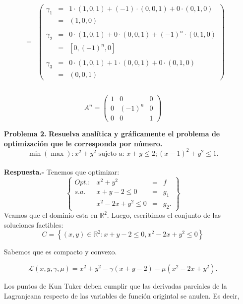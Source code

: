 \begin{enumerate}
$$\begin{array}{rcl}
	&=&
	\left(\begin{array}{rcl}
	    \gamma_1 &=& 1\cdot(1,0,1)+(-1)\cdot(0,0,1)+0\cdot(0,1,0)\\
		     &=&(1,0,0)\\\\
	    \gamma_2 &=& 0\cdot(1,0,1)+0\cdot(0,0,1)+(-1)^n\cdot(0,1,0)\\
		     &=&\left[0,(-1)^n,0\right]\\\\
	    \gamma_3 &=& 0\cdot(1,0,1)+1\cdot(0,0,1)+0\cdot(0,1,0)\\
		     &=&(0,0,1)
	\end{array}\right)\\\\
    \end{array}$$
    
    \begin{tcolorbox}
	$$A^n = \left(\begin{array}{*{3}{r}}
	    1 & 0 & 0 \\
	    0 & (-1)^n & 0 \\
	    0 & 0 & 1
	\end{array}\right)$$
    \end{tcolorbox}
    \vspace{1cm}



    \item [\bfseries Problema 2.] \textbf{\boldmath Resuelva analítica y gráficamente el problema de optimización que le corresponda por número.
    $$\min(\max):x^2+y^2\mbox{ sujeto a: } x+y\leq 2; (x-1)^2+y^2\leq 1.$$\\
	Respuesta.-\;} Tenemos que optimizar:
	$$\left\{\begin{array}{llll}
		Opt.: & x^2+y^2&=&f\\
		s.a. & x+y-2\leq 0&=&g_1\\
		     & x^2-2x+y^2\leq 0&=&g_2.
	\end{array}\right\}$$
	Veamos que el dominio esta en $\mathbb{R}^2$. Luego, escribimos el conjunto de las soluciones factibles:
	$$C=\left\{(x,y)\in \mathbb{R}^2:x+y-2\leq 0, x^2-2x+y^2\leq 0\right\}$$



	Sabemos que es compacto y convexo. 

	$$\mathcal{L}(x,y,\gamma,\mu)=x^2+y^2-\gamma(x+y-2)-\mu(x^2-2x+y^2).$$

	Los puntos de Kun Tuker deben cumplir que las derivadas parciales de la Lagranjeana respecto de las variables de función origintal se anulen. Es decir,


\end{enumerate}
